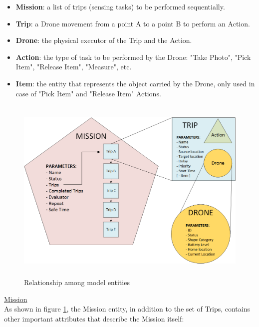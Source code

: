 \begin{itemize}
\itemsep2pt
\item{
\textbf{Mission}: a list of trips (sensing tasks) to be performed sequentially.
}
\item{
\textbf{Trip}: a Drone movement from a point A to a point B to perform an Action.
}
\item{
\textbf{Drone}: the physical executor of the Trip and the Action.
}
\item{
\textbf{Action}: the type of task to be performed by the Drone: "Take Photo", "Pick Item", "Release Item", "Measure", etc.
}
\item{
\textbf{Item}: the entity that represents the object carried by the Drone, only used in case of "Pick Item" and "Release Item" Actions.
}
\end{itemize}

\begin{figure}[h!]
  \centering
  \includegraphics[width=\linewidth,height=9cm]
  {pictures/EntityRelationship.png}
  \caption{Relationship among model entities}
  \label{fig:EntityRelationship}
\end{figure}

\underline{Mission}
\\

As shown in figure \ref{fig:EntityRelationship}, the Mission entity, in addition to the set of Trips, contains other important attributes that describe the Mission itself:


